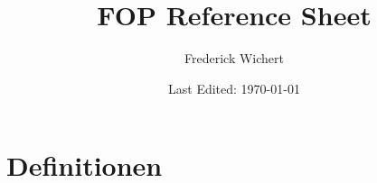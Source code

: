 


\begin{titlepage}
  \title{FOP Reference Sheet} %
  \author{Frederick Wichert}
  \date{Last Edited: \today}
\end{titlepage}



	\maketitle
	
	\setcounter{secnumdepth}{1}
	\setcounter{tocdepth}{1}
	\tableofcontents
	
	\newpage
		
\section{Definitionen}


